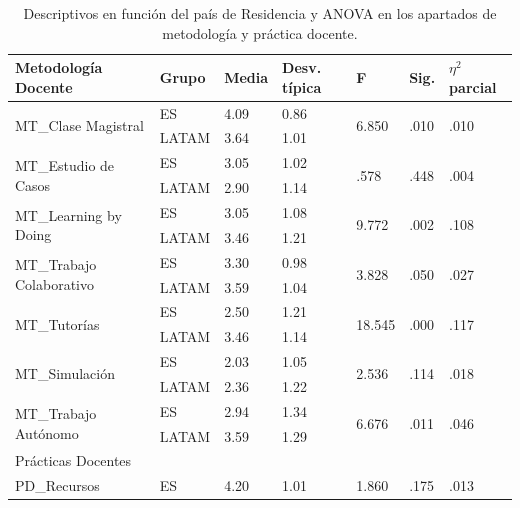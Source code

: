 \documentclass[spanish]{textolivre}
\begin{document}
\begin{table}[h]
    \centering
    \begin{threeparttable}
    \caption{Descriptivos en función del país de Residencia y ANOVA en los apartados de metodología y práctica docente.}
    \label{tab04}
    \begin{tabular}{*{7}{l}}
    \toprule
    Metodología Docente & Grupo & Media & Desv. típica & F & Sig. & $\eta^2$ parcial \\
    \midrule
    \multirow{2}{*}{MT\_Clase Magistral} & ES & 4.09 & 0.86 & \multirow{2}{*}{6.850} & \multirow{2}{*}{.010} & \multirow{2}{*}{.010} \\
    & LATAM & 3.64 & 1.01 & & & \\
    \multirow{2}{*}{MT\_Estudio de Casos} & ES & 3.05 & 1.02 & \multirow{2}{*}{.578} & \multirow{2}{*}{.448} & \multirow{2}{*}{.004} \\
    & LATAM & 2.90 & 1.14 & & & \\
    \multirow{2}{*}{MT\_Learning by Doing} & ES & 3.05 & 1.08 & \multirow{2}{*}{9.772} &  \multirow{2}{*}{.002} & \multirow{2}{*}{.108} \\
    & LATAM & 3.46 & 1.21 & & & \\
    \multirow{2}{*}{MT\_Trabajo Colaborativo} & ES & 3.30 & 0.98 & \multirow{2}{*}{3.828} & \multirow{2}{*}{.050} & \multirow{2}{*}{.027} \\
    & LATAM & 3.59 & 1.04 & & & \\
    \multirow{2}{*}{MT\_Tutorías} & ES & 2.50 & 1.21 & \multirow{2}{*}{18.545} & \multirow{2}{*}{.000} & \multirow{2}{*}{.117} \\
    & LATAM & 3.46 & 1.14 & & & \\
    \multirow{2}{*}{MT\_Simulación} & ES & 2.03 & 1.05 & \multirow{2}{*}{2.536} & \multirow{2}{*}{.114} & \multirow{2}{*}{.018} \\
    & LATAM & 2.36 & 1.22 & & & \\
    \multirow{2}{*}{MT\_Trabajo Autónomo} & ES & 2.94 & 1.34 & \multirow{2}{*}{6.676} & \multirow{2}{*}{.011} & \multirow{2}{*}{.046} \\
    & LATAM & 3.59 & 1.29 & & & \\
    \midrule
    Prácticas Docentes & & & & & & \\
    \midrule
    \multirow{2}{*}{PD\_Recursos} & ES & 4.20 & 1.01 & \multirow{2}{*}{1.860} & \multirow{2}{*}{.175} & \multirow{2}{*}{.013} \\

\end{tabular}
\end{threeparttable}
\end{table}
\end{document}
